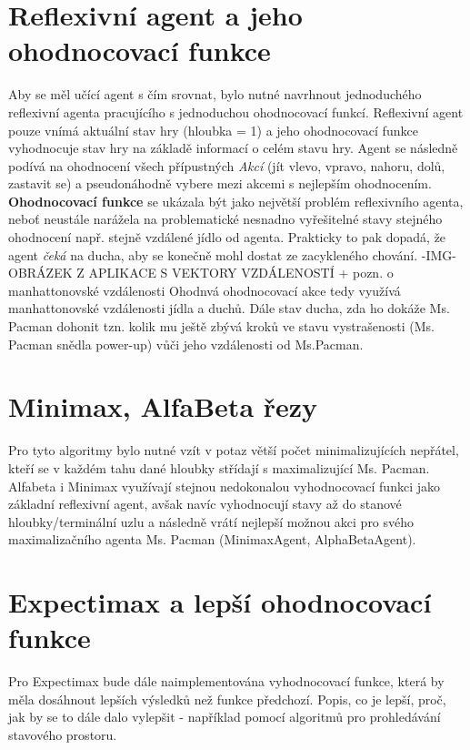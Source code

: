 \section{Reflexivní agent a jeho ohodnocovací funkce}
Aby se měl učící agent s čím srovnat, bylo nutné navrhnout jednoduchého reflexivní agenta pracujícího s jednoduchou ohodnocovací funkcí. Reflexivní agent pouze vnímá aktuální stav hry (hloubka = 1) a jeho ohodnocovací funkce vyhodnocuje stav hry na základě informací o celém stavu hry. Agent se následně podívá na ohodnocení všech přípustných \textit{Akcí} (jít vlevo, vpravo, nahoru, dolů, zastavit se) a pseudonáhodně vybere mezi akcemi s nejlepším ohodnocením. \textbf{Ohodnocovací funkce} se ukázala být jako největší problém reflexivního agenta, neboť neustále narážela na problematické nesnadno vyřešitelné stavy stejného ohodnocení např. stejně vzdálené jídlo od agenta. Prakticky to pak dopadá, že agent \textit{čeká} na ducha, aby se konečně mohl dostat ze zacykleného chování. -IMG- OBRÁZEK Z APLIKACE S VEKTORY VZDÁLENOSTÍ + pozn. o manhattonovské vzdálenosti Ohodnvá ohodnocovací akce tedy využívá manhattonovské vzdálenosti jídla a duchů. Dále stav ducha, zda ho dokáže Ms. Pacman dohonit tzn. kolik mu ještě zbývá kroků ve stavu vystrašenosti (Ms. Pacman snědla power-up) vůči jeho vzdálenosti od Ms.Pacman.

\section{Minimax, AlfaBeta řezy}
Pro tyto algoritmy bylo nutné vzít v potaz větší počet minimalizujících nepřátel, kteří se v každém tahu dané hloubky střídají s maximalizující Ms. Pacman. Alfabeta i Minimax využívají stejnou nedokonalou vyhodnocovací funkci jako základní reflexivní agent, avšak navíc vyhodnocují stavy až do stanové hloubky/terminální uzlu a následně vrátí nejlepší možnou akci pro svého maximalizačního agenta Ms. Pacman (MinimaxAgent, AlphaBetaAgent).
\section{Expectimax a lepší ohodnocovací funkce}
Pro Expectimax bude dále naimplementována vyhodnocovací funkce, která by měla dosáhnout lepších výsledků než funkce předchozí. Popis, co je lepší, proč, jak by se to dále dalo vylepšit - například pomocí algoritmů pro prohledávání stavového prostoru.

